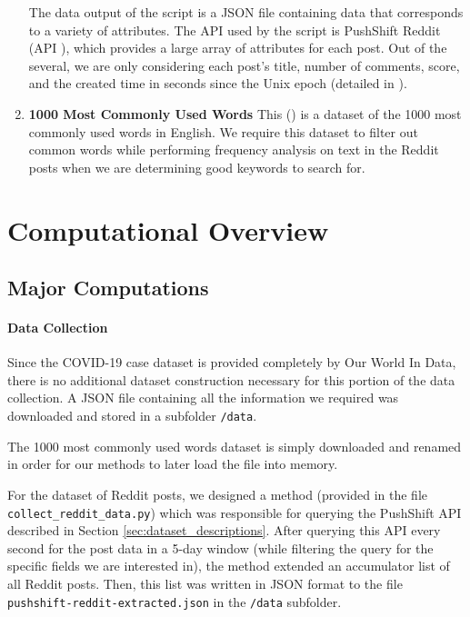 \documentclass[fontsize=11pt]{article}
\begin{document}
\begin{enumerate}
    The data output of the script is a JSON file containing data that corresponds to a variety of attributes. The API used by the script is PushShift Reddit (API \cite{pushshif39:online}), which provides a large array of attributes for each post. Out of the several, we are only considering each post's title, number of comments, score, and the created time in seconds since the Unix epoch (detailed in \cite{Epoch0:online}).
    \item \textbf{1000 Most Commonly Used Words} This (\cite{deekayen_1000_nodate}) is a dataset of the 1000 most commonly used words in English. We require this dataset to filter out common words while performing frequency analysis on text in the Reddit posts when we are determining good keywords to search for.
\end{enumerate}

\section{Computational Overview}

\subsection{Major Computations}
\label{subsec:major_computations}

\paragraph{Data Collection}
    Since the COVID-19 case dataset is provided completely by Our World In Data, there is no additional dataset construction necessary for this portion of the data collection. A JSON file containing all the information we required was downloaded and stored in a subfolder \texttt{/data}. 
    
    The 1000 most commonly used words dataset is simply downloaded and renamed in order for our methods to later load the file into memory.
    
    For the dataset of Reddit posts, we designed a method (provided in the file \texttt{collect\_reddit\_data.py}) which was responsible for querying the PushShift API described in Section \ref{sec:dataset_descriptions}. After querying this API every second for the post data in a 5-day window (while filtering the query for the specific fields we are interested in), the method extended an accumulator list of all Reddit posts. Then, this list was written in JSON format to the file \texttt{pushshift-reddit-extracted.json} in the \texttt{/data} subfolder.
    
\end{document}
